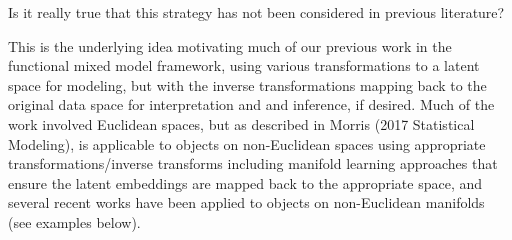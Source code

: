 \begin{itemize}
    Is it really true that this strategy has not been considered in previous literature?

    This is the underlying idea motivating much of our previous work in the functional mixed model framework, using various transformations to a latent space for modeling, but with the inverse transformations mapping back to the original data space for interpretation and and inference, if desired.  Much of the work involved Euclidean spaces, but as described in Morris (2017 Statistical Modeling), is applicable to objects on non-Euclidean spaces using appropriate transformations/inverse transforms including manifold learning approaches that ensure the latent embeddings are mapped back to the appropriate space, and several recent works have been applied to objects on non-Euclidean manifolds (see examples below).  
    

\end{itemize}
